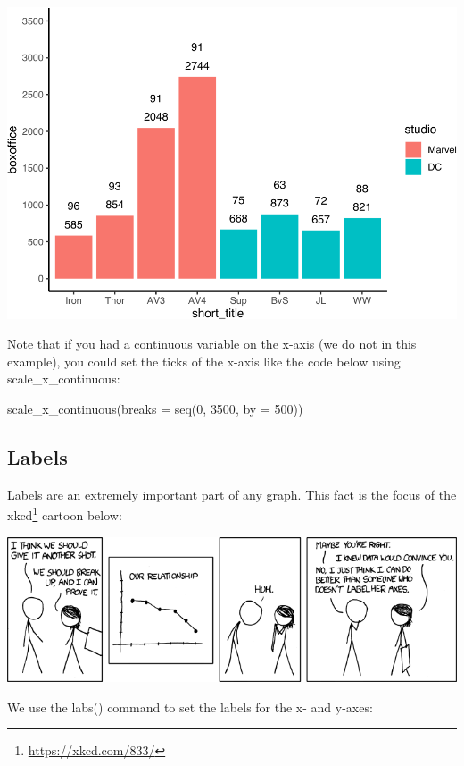 \documentclass[
]{krantz}
\makeatletter
\newenvironment{Shaded}{\begin{snugshade}}{\end{snugshade}}
\newcommand{\AttributeTok}[1]{\textcolor[rgb]{0.61,0.61,0.61}{#1}}
\newcommand{\DecValTok}[1]{\textcolor[rgb]{0.06,0.06,0.06}{#1}}
\newcommand{\FunctionTok}[1]{\textcolor[rgb]{0,0,0}{#1}}
\newcommand{\NormalTok}[1]{#1}
\renewcommand{\href}[2]{#2\footnote{\url{#1}}}
\newenvironment{kframe}{%
\medskip{}
\setlength{\fboxsep}{.8em}
 \def\at@end@of@kframe{}%
 \ifinner\ifhmode%
  \def\at@end@of@kframe{\end{minipage}}%
  \begin{minipage}{\columnwidth}%
 \fi\fi%
 \def\FrameCommand##1{\hskip\@totalleftmargin \hskip-\fboxsep
 \colorbox{shadecolor}{##1}\hskip-\fboxsep
     \hskip-\linewidth \hskip-\@totalleftmargin \hskip\columnwidth}%
 \MakeFramed {\advance\hsize-\width
   \@totalleftmargin\z@ \linewidth\hsize
   \@setminipage}}%
 {\par\unskip\endMakeFramed%
 \at@end@of@kframe}
\renewenvironment{Shaded}{\begin{kframe}}{\end{kframe}}
\makeatother
\begin{document}
\includegraphics[width=0.65\linewidth]{bookdown_files/figure-latex/unnamed-chunk-208-1}

Note that if you had a continuous variable on the x-axis (we do not in this example), you could set the ticks of the x-axis like the code below using scale\_x\_continuous:

\begin{Shaded}
\begin{Highlighting}[]
\FunctionTok{scale\_x\_continuous}\NormalTok{(}\AttributeTok{breaks =} \FunctionTok{seq}\NormalTok{(}\DecValTok{0}\NormalTok{, }\DecValTok{3500}\NormalTok{, }\AttributeTok{by =} \DecValTok{500}\NormalTok{))}
\end{Highlighting}
\end{Shaded}

\hypertarget{labels}{%
\subsection{Labels}\label{labels}}

Labels are an extremely important part of any graph. This fact is the focus of the \href{https://xkcd.com/833/}{xkcd} cartoon below:

\includegraphics[width=0.8\linewidth]{ch_graphing/images/convincing}

We use the labs() command to set the labels for the x- and y-axes:
\end{document}
